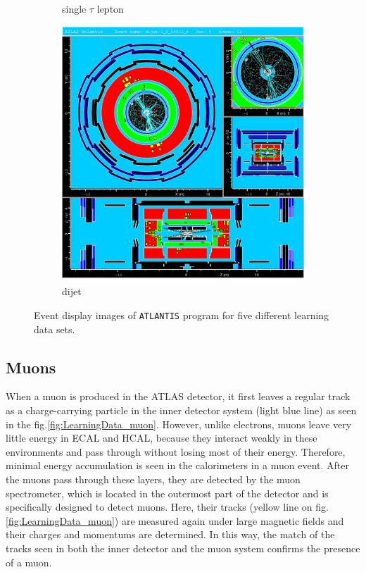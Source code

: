 \begin{figure}[h]
\begin{subfigure}{0.45\textwidth}
		\caption{single $\tau$ lepton}
		\label{fig:LearningData_tau}
	\end{subfigure} 
	\hfill
	\begin{subfigure}{0.45\textwidth}
		\centering
		\includegraphics[width=\textwidth]{../figures/LearningData_dijet.pdf}
		\caption{dijet}
		\label{fig:LearningData_dijet}
	\end{subfigure}
	\caption{Event display images of \texttt{ATLANTIS} program for five different learning data sets.}
	\label{fig:eventdisplay_Learning}
\end{figure}
\FloatBarrier

\subsection{Muons}
\label{subsec:Muons_disp}
When a muon is produced in the ATLAS detector, it first leaves a regular track as a charge-carrying particle in the inner detector system (light blue line) as seen in the fig.\ref{fig:LearningData_muon}. However, unlike electrons, muons leave very little energy in ECAL and HCAL, because they interact weakly in these environments and pass through without losing most of their energy. Therefore, minimal energy accumulation is seen in the calorimeters in a muon event. After the muons pass through these layers, they are detected by the muon spectrometer, which is located in the outermost part of the detector and is specifically designed to detect muons. Here, their tracks (yellow line on fig.\ref{fig:LearningData_muon}) are measured again under large magnetic fields and their charges and momentums are determined. In this way, the match of the tracks seen in both the inner detector and the muon system confirms the presence of a muon.


